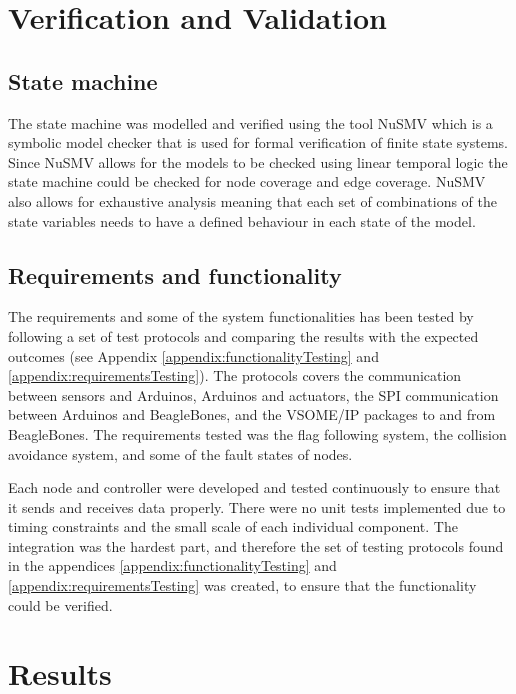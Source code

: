 \documentclass[11pt, titlepage]{article} %
\begin{document}
\clearpage
\section{Verification and Validation}

\subsection{State machine}
The state machine was modelled and verified using the tool NuSMV which is a symbolic model checker that is used for formal verification of finite state systems. Since NuSMV allows for the models to be checked using linear temporal logic the state machine could be checked for node coverage and edge coverage. NuSMV also allows for exhaustive analysis meaning that each set of combinations of the state variables needs to have a defined behaviour in each state of the model.

\subsection{Requirements and functionality}
The requirements and some of the system functionalities has been tested by following a set of test protocols and comparing the results with the expected outcomes (see Appendix \ref{appendix:functionalityTesting} and \ref{appendix:requirementsTesting}). The protocols covers the communication between sensors and Arduinos, Arduinos and actuators, the SPI communication between Arduinos and BeagleBones, and the VSOME/IP packages to and from BeagleBones. The requirements tested was the flag following system, the collision avoidance system, and some of the fault states of nodes.

Each node and controller were developed and tested continuously to ensure that it sends and receives data properly. There were no unit tests implemented due to timing constraints and the small scale of each individual component. The integration was the hardest part, and therefore the set of testing protocols found in the appendices \ref{appendix:functionalityTesting} and \ref{appendix:requirementsTesting} was created, to ensure that the functionality could be verified.  

\clearpage
\section{Results}
\end{document}
